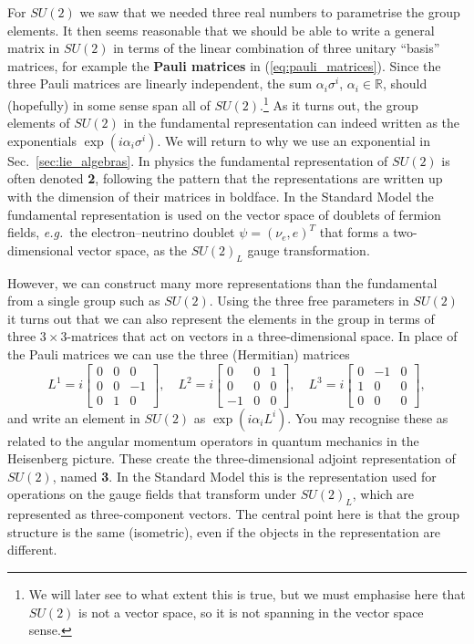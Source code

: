 \documentclass[notes.tex]{subfiles}
\begin{document}
For $SU(2)$ we saw that we needed three real numbers to parametrise the group elements. It then seems reasonable that we should be able to write a general matrix in $SU(2)$ in terms of the linear combination of three unitary ``basis'' matrices, for example the {\bf Pauli matrices} in (\ref{eq:pauli_matrices}). Since the three Pauli matrices are linearly independent, the sum $\alpha_i\sigma^i$, $\alpha_i\in\mathbb R$, should (hopefully) in some sense span all of $SU(2)$.\footnote{We will later see to what extent this is true, but we must emphasise here that $SU(2)$ is not a vector space, so it is not spanning in the vector space sense.} As it turns out, the group elements of $SU(2)$ in the fundamental representation can indeed written as the exponentials  $\exp(i \alpha_i \sigma^i)$. We will return to why we use an exponential in Sec.~\ref{sec:lie_algebras}. In physics the fundamental representation of $SU(2)$ is often denoted {\bf 2}, following the pattern that the representations are written up with the dimension of their matrices in boldface. In the Standard Model the fundamental representation is used on the vector space of doublets of fermion fields, {\it e.g.}\ the electron--neutrino doublet $\psi = (\nu_e, e)^T$ that forms a two-dimensional vector space, as the $SU(2)_L$ gauge transformation. 

However, we can construct many more representations than the fundamental from a single group such as $SU(2)$. Using the three free parameters in $SU(2)$ it turns out that we can also represent the elements in the group in terms of three  $3\times3$-matrices that act on vectors in a three-dimensional space. In place of the Pauli matrices we can use the three (Hermitian) matrices
\begin{equation}
L^1 =i\left[\begin{matrix} 0 & 0 & 0 \\ 0 & 0 & -1 \\ 0 & 1 & 0  \end{matrix}\right], 
\quad L^2 =i\left[\begin{matrix} 0 & 0 & 1 \\ 0 & 0 & 0 \\ -1 & 0 & 0  \end{matrix}\right], 
\quad L^3 =i\left[\begin{matrix} 0 & -1 & 0 \\ 1 & 0 & 0 \\ 0 & 0 & 0  \end{matrix}\right],
\label{eq:SO3_generators}
\end{equation}
and write an element in $SU(2)$ as $\exp(i\alpha_i L^i)$.
You may recognise these as related to the angular momentum operators in quantum mechanics in the Heisenberg picture. These create the three-dimensional adjoint representation of $SU(2)$, named {\bf 3}. In the Standard Model this is the representation used for operations on the gauge fields that transform under $SU(2)_L$, which are represented as three-component vectors. The central point here is that the group structure is the same (isometric), even if the objects in the representation are different.
\end{document}
